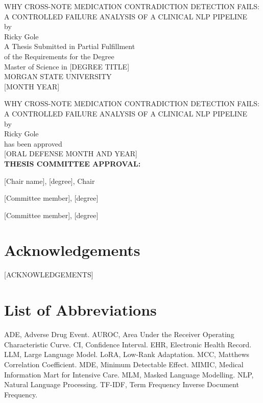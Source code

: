 \documentclass[12pt]{report}
\begin{document}
\newpage
\begin{center}
WHY CROSS-NOTE MEDICATION CONTRADICTION DETECTION FAILS:\\
A CONTROLLED FAILURE ANALYSIS OF A CLINICAL NLP PIPELINE\\[12pt]
by\\[12pt]
Ricky Gole\\[24pt]
A Thesis Submitted in Partial Fulfillment\\
of the Requirements for the Degree\\
Master of Science in [DEGREE TITLE]\\[24pt]
MORGAN STATE UNIVERSITY\\[12pt]
[MONTH YEAR]
\end{center}

\newpage
\begin{center}
WHY CROSS-NOTE MEDICATION CONTRADICTION DETECTION FAILS:\\
A CONTROLLED FAILURE ANALYSIS OF A CLINICAL NLP PIPELINE\\[12pt]
by\\[12pt]
Ricky Gole\\[24pt]
has been approved\\[6pt]
[ORAL DEFENSE MONTH AND YEAR]\\[24pt]
\textbf{THESIS COMMITTEE APPROVAL:}
\end{center}

[Chair name], [degree], Chair

[Committee member], [degree]

[Committee member], [degree]

\newpage
\section*{Acknowledgements}

[ACKNOWLEDGEMENTS]

\newpage
\section*{List of Abbreviations}

ADE, Adverse Drug Event. AUROC, Area Under the Receiver Operating Characteristic
Curve. CI, Confidence Interval. EHR, Electronic Health Record. LLM, Large Language
Model. LoRA, Low-Rank Adaptation. MCC, Matthews Correlation Coefficient. MDE,
Minimum Detectable Effect. MIMIC, Medical Information Mart for Intensive Care.
MLM, Masked Language Modelling. NLP, Natural Language Processing. TF-IDF, Term
Frequency Inverse Document Frequency.

\newpage
\tableofcontents
\listoftables
\listoffigures











\appendix




\end{document}

